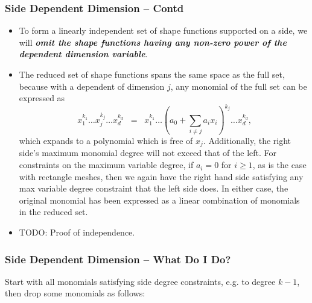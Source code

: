 \documentclass[compress]{beamer}
\begin{document}
\begin{frame}
  \frametitle{Side Dependent Dimension -- Contd}
  \begin{itemize}[<+->]
    \item To form a linearly independent set of shape functions supported on a side, we will \emph{\textbf{omit the shape functions
      having any non-zero power of the dependent dimension variable}}.
    \item The reduced set of shape functions spans the same space as the full set, because with a dependent of dimension $j$,
      any monomial of the full set can be expressed as
       $$x_1^{k_1} \dots x_j^{k_j} \dots x_d^{k_d}
           \;\; = \;\; x_1^{k_1} \dots (a_0 + \sum_{i \ne j} a_i x_{i})^{k_j} \dots x_d^{k_d}\text{,}$$
      which expands to a polynomial which is free of $x_j$. Additionally, the right side's maximum monomial degree will not exceed
      that of the left.  For constraints on the maximum variable degree, if $a_i = 0$ for $i \ge 1$,
      as is the case with rectangle meshes, then we again have the right hand side satisfying any max variable degree constraint
      that the left side does. In either case, the original monomial has been expressed as a linear combination of monomials in the reduced set.
    \item TODO: Proof of independence.
  \end{itemize}
\end{frame}


\begin{frame}
  \frametitle{Side Dependent Dimension -- What Do I Do?}
  \pause
  Start with all monomials satisfying side degree constraints, e.g. to degree $k-1$, then drop some monomials as follows:
  \pause
  \pause
\end{frame}
\end{document}
